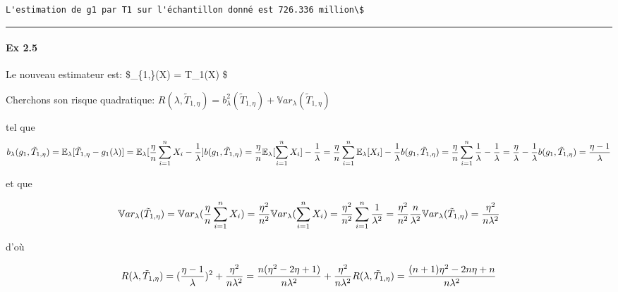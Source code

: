 \documentclass[11pt]{article}
\begin{document}
    \begin{Verbatim}[commandchars=\\\{\}]
L'estimation de g1 par T1 sur l'échantillon donné est 726.336 million\$

    \end{Verbatim}

    \begin{center}\rule{0.5\linewidth}{\linethickness}\end{center}

\paragraph{Ex 2.5}\label{ex-2.5}

    Le nouveau estimateur est: \$\_\{1,\eta\}(X) = \eta T\_1(X) \$

Cherchons son risque quadratique:
\(R(\lambda,\tilde{T}_{1,\eta}) = b^2_\lambda(\tilde{T}_{1,\eta}) +\mathbb{V}ar_\lambda(\tilde{T}_{1,\eta})\)

tel que
\[b_\lambda(g_1,\tilde{T}_{1,\eta}) = \mathbb{E}_\lambda[\tilde{T}_{1,\eta}-g_1(\lambda)] = \mathbb{E}_\lambda[\frac{\eta}{n}\sum_{i=1}^nX_i - \frac{1}{\lambda}]\\
    b(g_1,\tilde{T}_{1,\eta}) = \frac{\eta}{n}\mathbb{E}_\lambda[\sum_{i=1}^nX_i] - \frac{1}{\lambda}= \frac{\eta}{n}\sum_{i=1}^n\mathbb{E}_\lambda[X_i] - \frac{1}{\lambda}\\
    b(g_1,\tilde{T}_{1,\eta}) = \frac{\eta}{n}\sum_{i=1}^n\frac{1}{\lambda} - \frac{1}{\lambda}= \frac{\eta}{\lambda} - \frac{1}{\lambda}\\
    b(g_1,\tilde{T}_{1,\eta}) = \frac{\eta-1}{\lambda}
\]

et que

\[\mathbb{V}ar_\lambda(\tilde{T}_{1,\eta}) = \mathbb{V}ar_\lambda(\frac{\eta}{n}\sum_{i=1}^nX_i) = \frac{\eta^2}{n^2}\mathbb{V}ar_\lambda(\sum_{i=1}^nX_i)= \frac{\eta^2}{n^2}\sum_{i=1}^n\frac{1}{\lambda^2} =
\frac{\eta^2}{n^2}\frac{n}{\lambda^2}\\ 
\mathbb{V}ar_\lambda(\tilde{T}_{1,\eta}) = \frac{\eta^2}{n\lambda^2}\]

d'où

\[R(\lambda,\tilde{T}_{1,\eta}) = (\frac{\eta-1}{\lambda})^2 + \frac{\eta^2}{n\lambda^2} 
                                = \frac{n(\eta^2-2 \eta +1)}{n\lambda^2} + \frac{\eta^2}{n\lambda^2}\\
R(\lambda,\tilde{T}_{1,\eta})   =\frac{(n+1)\eta^2-2 n\eta +n}{n\lambda^2} \]
\end{document}
